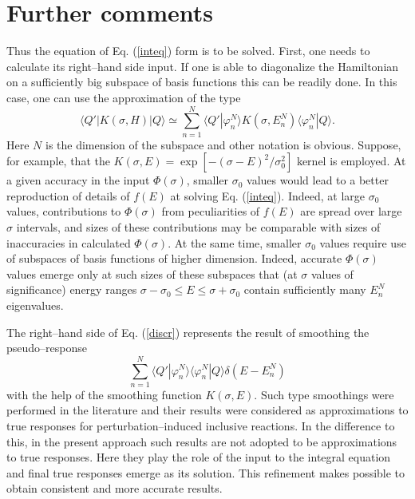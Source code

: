 \documentclass[12pt,ams,preprint,a4paper]{revtex4}
\begin{document}
\section{Further comments}

Thus the equation of Eq. (\ref{inteq}) form is to be solved. First, one needs to calculate its
right--hand side input. If one is able to diagonalize the Hamiltonian on a sufficiently big subspace 
of basis functions this can be readily done. In this case, one can use the approximation of the type
\begin{equation}
\langle Q'|K(\sigma,H)|Q\rangle\simeq\sum_{n=1}^N\langle Q'|\varphi_n^N\rangle 
K(\sigma,E_n^N)\langle\varphi_n^N|Q\rangle.\label{discr}
\end{equation}
Here $N$ is the dimension of the subspace and other notation is obvious. 
Suppose, for example, that the  
$K(\sigma,E)=\exp[-(\sigma-E)^2/\sigma_0^2]$ kernel is employed. At a given 
accuracy in the input $\Phi(\sigma)$,  smaller $\sigma_0$
values would lead to a better reproduction of details of $f(E)$ at solving Eq. (\ref{inteq}).
Indeed, at large $\sigma_0$ values,
contributions to $\Phi(\sigma)$ from peculiarities of $f(E)$ are spread over large $\sigma$ intervals,
and sizes of these contributions 
may be comparable with sizes of inaccuracies in calculated $\Phi(\sigma)$.  
At the same time, smaller $\sigma_0$ values require use of subspaces of basis functions of
higher dimension. Indeed, accurate $\Phi(\sigma)$ 
values emerge only at such sizes of these subspaces  that (at $\sigma$ values
of significance) energy ranges $\sigma-\sigma_0\le E\le\sigma+\sigma_0$ contain
sufficiently many $E_n^N$ eigenvalues.

The right--hand side of Eq. (\ref{discr}) represents the result of smoothing the pseudo--response
$$
\sum_{n=1}^N\langle Q'|\varphi_n^N\rangle \langle\varphi_n^N|Q\rangle\delta(E-E_n^N)
$$  
with the help of the smoothing function $K(\sigma,E)$. Such type smoothings were performed in the
literature and their results were considered as approximations to true responses for 
perturbation--induced   inclusive reactions. In the difference to this, in the present approach 
such results are not adopted to be approximations to true responses. Here they play the role of
the input to the integral equation and final true responses emerge as its solution. This 
refinement makes possible
to obtain consistent and more accurate results.
\end{document}

